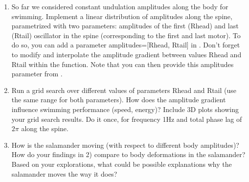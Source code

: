 \documentclass{cmc}
\begin{document}
\begin{enumerate}
\item So far we considered constant undulation amplitudes along the body for
  swimming. Implement a linear distribution of amplitudes along the spine,
  parametrized with two parameters: amplitudes of the first (Rhead) and last
  (Rtail) oscillator in the spine (corresponding to the first and last
  motor). To do so, you can add a parameter amplitudes=[Rhead, Rtail] in
  . Don't forget to modify
  \-
  and interpolate the amplitude gradient between values Rhead and Rtail within
  the function. Note that you can then provide this amplitudes parameter from
  .
\item Run a grid search over different values of parameters Rhead and Rtail (use
  the same range for both parameters). How does the amplitude gradient influence
  swimming performance (speed, energy)?  Include 3D plots showing your grid
  search results. Do it once, for frequency 1Hz and total phase lag of $2\pi$
  along the spine.
\item How is the salamander moving (with respect to different body amplitudes)?
  How do your findings in 2) compare to body deformations in the salamander?
  Based on your explorations, what could be possible explanations why the
  salamander moves the way it does?
\end{enumerate}
\end{document}
